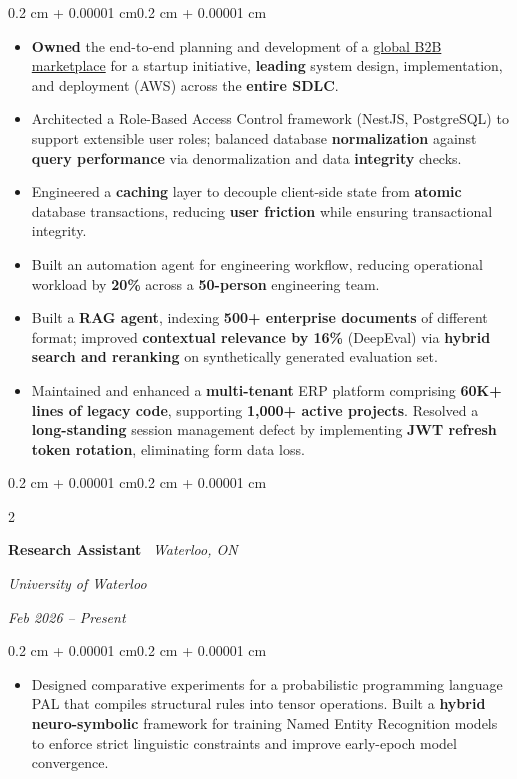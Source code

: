 \documentclass[10pt, letterpaper]{article}
\newenvironment{highlights}{
    \begin{itemize}[
        topsep=0.10 cm,
        parsep=0.10 cm,
        partopsep=0pt,
        itemsep=0pt,
        leftmargin=0.10 cm + 10pt
    ]
}{\end{itemize}}
\newenvironment{onecolentry}{
    \begin{adjustwidth}{0.2 cm + 0.00001 cm}{0.2 cm + 0.00001 cm}
}{\end{adjustwidth}}
\newenvironment{twocolentry}[2][]{
    \onecolentry
    \def\secondColumn{#2}
    \setcolumnwidth{\fill, 4.5 cm}
    \begin{paracol}{2}
}{
    \switchcolumn \raggedleft \secondColumn
    \end{paracol}
    \endonecolentry
}
\let\hrefWithoutArrow\href
\renewcommand{\href}[2]{\hrefWithoutArrow{#1}{\ifthenelse{\equal{#2}{}}{ }{#2 }\raisebox{.15ex}{\footnotesize \faExternalLink*}}}
\begin{document}
    \vspace{0.10 cm}
    \begin{onecolentry}
        \begin{highlights}
        \item \textbf{Owned} the end-to-end planning and development of a \hrefWithoutArrow{https://neshub.net}{global B2B marketplace} for a startup initiative, \textbf{leading} system design, implementation, and deployment (AWS) across the \textbf{entire SDLC}.
        \item Architected a Role-Based Access Control framework (NestJS, PostgreSQL) to support extensible user roles; balanced database \textbf{normalization} against \textbf{query performance} via denormalization and data \textbf{integrity} checks.
        \item Engineered a \textbf{caching} layer to decouple client-side state from \textbf{atomic} database transactions, reducing \textbf{user friction} while ensuring transactional integrity.
        \item Built an automation agent for engineering workflow, reducing operational workload by \textbf{20\%} across a \textbf{50-person} engineering team.
        \item Built a \textbf{RAG agent}, indexing \textbf{500+ enterprise documents} of different format; improved \textbf{contextual relevance by 16\%} (DeepEval) via \textbf{hybrid search and reranking} on synthetically generated evaluation set.
        \item Maintained and enhanced a \textbf{multi-tenant} ERP platform comprising \textbf{60K+ lines of legacy code}, supporting \textbf{1,000+ active projects}. Resolved a \textbf{long-standing} session management defect by implementing \textbf{JWT refresh token rotation}, eliminating form data loss.
        \end{highlights}
    \end{onecolentry}
    \vspace{0.2cm}
    \begin{twocolentry}{

    \textit{Feb 2026 -- Present}}
        \textbf{Research Assistant} \textbar\ \textit{Waterloo, ON}
        
        \textit{University of Waterloo}
    \end{twocolentry}

    \vspace{0.10 cm}
    \begin{onecolentry}
        \begin{highlights}
        \item Designed comparative experiments for a probabilistic programming language PAL that compiles structural rules into tensor operations. Built a \textbf{hybrid neuro-symbolic} framework for training Named Entity Recognition models to enforce strict linguistic constraints and improve early-epoch model convergence.
        \end{highlights}
    \end{onecolentry}
\end{document}

